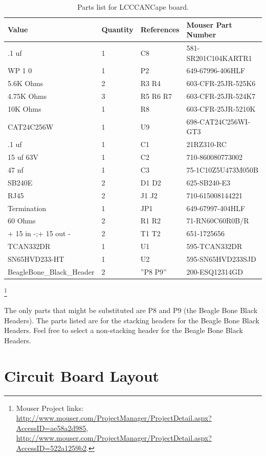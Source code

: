 \begin{table}[htp]
\begin{centering}\begin{tabular}{|l|l|p{1in}|l|}
\hline
Value&Quantity&References&Mouser Part Number \\
\hline
.1 uf&1&C8&581-SR201C104KARTR1 \\
\hline
WP 1 0&1&P2&649-67996-406HLF \\
\hline
5.6K Ohms&2&R3 R4&603-CFR-25JR-525K6 \\
\hline
4.75K Ohms&3&R5 R6 R7&603-CFR-25JR-524K7 \\
\hline
10K Ohms&1&R8&603-CFR-25JR-5210K \\
\hline
CAT24C256W&1&U9&698-CAT24C256WI-GT3 \\
\hline
.1 uf&1&C1&21RZ310-RC \\
\hline
15 uf 63V&1&C2&710-860080773002 \\
\hline
47 nf&1&C3&75-1C10Z5U473M050B \\
\hline
SB240E&2&D1 D2&625-SB240-E3 \\
\hline
RJ45&2&J1 J2&710-615008144221 \\
\hline
Termination&1&JP1&649-67997-404HLF \\
\hline
60 Ohms&2&R1 R2&71-RN60C60R0B/R \\
\hline
+ 15 in -;+ 15 out -&2&T1 T2&651-1725656 \\
\hline
TCAN332DR&1&U1&595-TCAN332DR \\
\hline
SN65HVD233-HT&1&U2&595-SN65HVD233SJD \\
\hline
BeagleBone\_Black\_Header&2&''P8 P9''&200-ESQ12314GD \\
\hline
\end{tabular}
\caption{Parts list for LCCCANCape board.}
\end{centering}\end{table}\footnote{Mouser Project links: 
\url{http://www.mouser.com/ProjectManager/ProjectDetail.aspx?AccessID=ae58a2d985},
\url{http://www.mouser.com/ProjectManager/ProjectDetail.aspx?AccessID=522a1259b2}.}


The only parts that might be substituted are P8 and P9 (the Beagle Bone Black
Headers). The parts listed are for the stacking headers for the Beagle Bone
Black Headers. Feel free to select a non-stacking header for the Beagle Bone
Black Headers.


\section{Circuit Board Layout}

